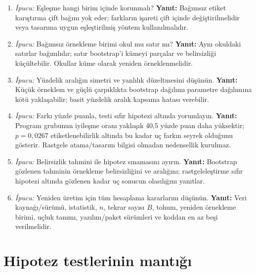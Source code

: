 \begin{enumerate}[leftmargin=*,itemsep=5pt]
\item \emph{İpucu:} Eşleşme hangi birim içinde korunmalı?
\textbf{Yanıt:} Bağımsız etiket karıştırma çift bağını yok eder; farkların
işareti çift içinde değiştirilmelidir veya tasarıma uygun eşleştirilmiş yöntem kullanılmalıdır.
\item \emph{İpucu:} Bağımsız örnekleme birimi okul mu satır mı?
\textbf{Yanıt:} Aynı okuldaki satırlar bağımlıdır; satır bootstrap'i kümeyi
parçalar ve belirsizliği küçültebilir. Okullar küme olarak yeniden örneklenmelidir.
\item \emph{İpucu:} Yüzdelik aralığın simetri ve yanlılık düzeltmesini düşünün.
\textbf{Yanıt:} Küçük örneklem ve güçlü çarpıklıkta bootstrap dağılımı
parametre dağılımına kötü yaklaşabilir; basit yüzdelik aralık kapsama hatası verebilir.
\item \emph{İpucu:} Farkı yüzde puanla, testi sıfır hipotezi altında yorumlayın.
\textbf{Yanıt:} Program grubunun iyileşme oranı yaklaşık 40,5 yüzde puan daha
yüksektir; $p=0{,}0267$ etiketlenebilirlik altında bu kadar uç farkın seyrek
olduğunu gösterir. Rastgele atama/tasarım bilgisi olmadan nedensellik kurulmaz.
\item \emph{İpucu:} Belirsizlik tahmini ile hipotez sınamasını ayırın.
\textbf{Yanıt:} Bootstrap gözlenen tahminin örnekleme belirsizliğini ve aralığını;
rastgeleleştirme sıfır hipotezi altında gözlenen kadar uç sonucun olasılığını yanıtlar.
\item \emph{İpucu:} Yeniden üretim için tüm hesaplama kararlarını düşünün.
\textbf{Yanıt:} Veri kaynağı/sürümü, istatistik, $n$, tekrar sayısı $B$, tohum,
yeniden örnekleme birimi, uçluk tanımı, yazılım/paket sürümleri ve koddan en az
beşi verilmelidir.
\end{enumerate}
\fi

\section{Hipotez testlerinin mantığı}

